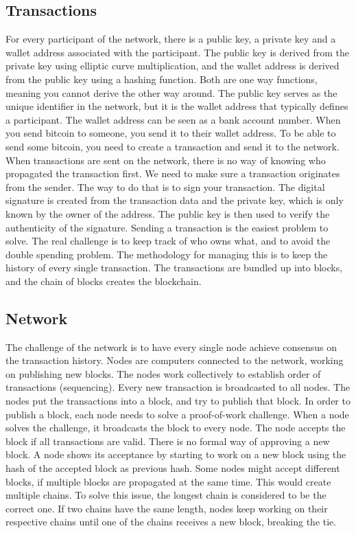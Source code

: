 \subsection{Transactions}
For every participant of the network, there is a public key, a private key and a wallet address associated with the participant.
The public key is derived from the private key using elliptic curve multiplication, and the wallet address is derived from the public key using a hashing function.
Both are one way functions, meaning you cannot derive the other way around.
The public key serves as the unique identifier in the network, but it is the wallet address that typically defines a participant.
The wallet address can be seen as a bank account number. When you send bitcoin to someone, you send it to their wallet address.
To be able to send some bitcoin, you need to create a transaction and send it to the network.
When transactions are sent on the network, there is no way of knowing who propagated the transaction first.
We need to make sure a transaction originates from the sender. The way to do that is to sign your transaction. The digital signature is created from the transaction data and the private key, which is only known by the owner of the address.
The public key is then used to verify the authenticity of the signature.
Sending a transaction is the easiest problem to solve. The real challenge is to keep track of who owns what, and to avoid the double spending problem.
The methodology for managing this is to keep the history of every single transaction. The transactions are bundled up into blocks, and the chain of blocks creates the blockchain.




\subsection{Network}
The challenge of the network is to have every single node achieve consensus on the transaction history. Nodes are computers connected to the network,
working on publishing new blocks. The nodes work collectively to establish order of transactions (sequencing). Every new transaction is broadcasted to all nodes.
The nodes put the transactions into a block, and try to publish that block. In order to publish a block, each node needs to solve a proof-of-work challenge.
When a node solves the challenge, it broadcasts the block to every node. The node accepts the block if all transactions are valid. There is no formal
way of approving a new block. A node shows its acceptance by starting to work on a new block using the hash of the accepted block as previous hash.
Some nodes might accept different blocks, if multiple blocks are propagated at the same time. This would create multiple chains. To solve this issue, the longest chain is considered to be the correct one.
If two chains have the same length, nodes keep working on their respective chains until one of the chains receives a new block, breaking the tie.




